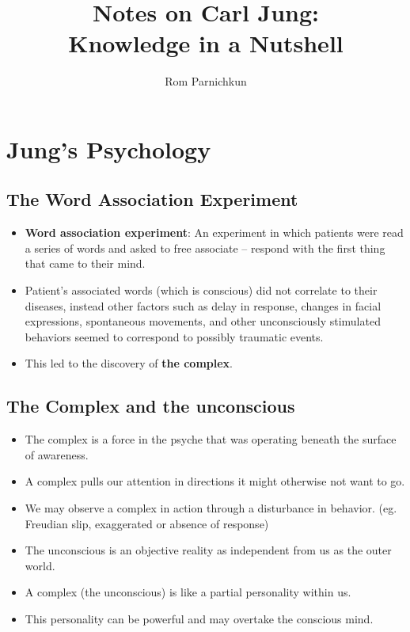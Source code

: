 \documentclass[twocolumn]{article}
\theoremstyle{plain}
\begin{document}
\title{Notes on Carl Jung:\\ 
Knowledge in a Nutshell}
\author{Rom Parnichkun}

\maketitle

\section{Jung's Psychology}

\subsection{The Word Association Experiment}

\begin{itemize}
    \item \textbf{Word association experiment}: An experiment in which patients were read a series of words and asked to free associate -- respond with the first thing that came to their mind.
    \item Patient's associated words (which is conscious) did not correlate to their diseases, instead other factors such as delay in response, changes in facial expressions, spontaneous movements, and other unconsciously stimulated behaviors seemed to correspond to possibly traumatic events.
    \item This led to the discovery of \textbf{the complex}.
\end{itemize}

\subsection{The Complex and the unconscious}

\begin{itemize}
    \item The complex is a force in the psyche that was operating beneath the surface of awareness.
    \item A complex pulls our attention in directions it might otherwise not want to go.
    \item We may observe a complex in action through a disturbance in behavior. (eg. Freudian slip, exaggerated or absence of response)
    \item The unconscious is an objective reality as independent from us as the outer world.
    \item A complex (the unconscious) is like a partial personality within us.
    \item This personality can be powerful and may overtake the conscious mind.
\end{itemize}
\end{document}
